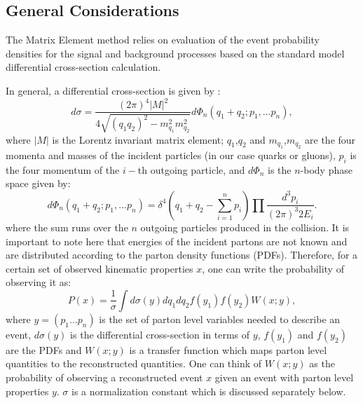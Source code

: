 \documentclass{cmspaper}
\begin{document}
\subsection{General Considerations}
The Matrix Element method relies on evaluation of the event probability densities for the signal and background processes based on the 
standard model differential cross-section calculation. 

In general, a differential cross-section is given by \cite{ref:PDG}:
\begin{equation}
d\sigma=\frac{(2\pi)^{4} \left| M \right|^{2}}{4\sqrt{(q_{1}q_{2})^{2}-m_{q_{1}}^{2}m_{q_{2}}^{2}}}d\Phi_{n}(q_{1}+q_{2};p_{1},...p_{n}),
\label{eqn:DiffXsecGeneral}  
\end{equation}
where $\left| M \right|$ is the Lorentz invariant matrix element;
$q_{1}$,$q_{2}$ and $m_{q_{1}}$,$m_{q_{2}}$ are the four momenta and masses of the incident particles 
(in our case quarks or gluons), 
$p_i$ is the four momentum of the $i-$th outgoing particle, 
and $d\Phi_{n}$ is the $n$-body phase space given by:
\begin{equation}
d\Phi_{n}(q_{1}+q_{2};p_{1},...p_{n})=\delta^{4}(q_{1}+q_{2}-\sum_{i=1}^{n}{p_{i}})\prod\frac{d^{3}p_{i}}{(2\pi)^{3}2E_{i}}.
\label{eqn:PhaseSpaceGeneral}  
\end{equation}
where the sum runs over the $n$ outgoing particles produced in the collision.
It is important to note here that energies of the incident partons are not known and are distributed according to the parton density 
functions (PDFs). Therefore, for a certain set of observed kinematic properties $x$, one can write the probability of observing it as:
\begin{equation}
P(x)=\frac{1}{\sigma}\int d\sigma(y)dq_{1}dq_{2}f(y_{1})f(y_{2})W(x;y),
\label{eqn:EvtProbGeneral}  
\end{equation}
where $y=(p_{1}...p_{n})$ is the set of parton level variables needed to describe an event, $d\sigma(y)$ is the differential cross-section 
in terms of $y$, $f(y_{1})$ and $f(y_{2})$ are the PDFs and $W(x;y)$ is a transfer function which maps parton level quantities to the 
reconstructed quantities.  One can think of $W(x;y)$ as the probability of observing a reconstructed event $x$ given an event with parton level properties $y$. $\sigma$ is a normalization constant which is discussed separately below.
\end{document}

